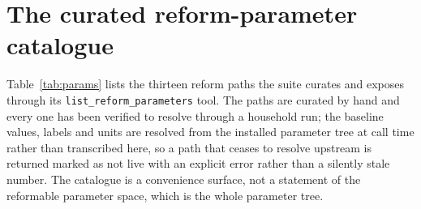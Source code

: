 \section{The curated reform-parameter catalogue}
\label{app:params}

Table~\ref{tab:params} lists the thirteen reform paths the suite curates and exposes through its \texttt{list\_reform\_parameters} tool. The paths are curated by hand and every one has been verified to resolve through a household run; the baseline values, labels and units are resolved from the installed parameter tree at call time rather than transcribed here, so a path that ceases to resolve upstream is returned marked as not live with an explicit error rather than a silently stale number. The catalogue is a convenience surface, not a statement of the reformable parameter space, which is the whole parameter tree.


